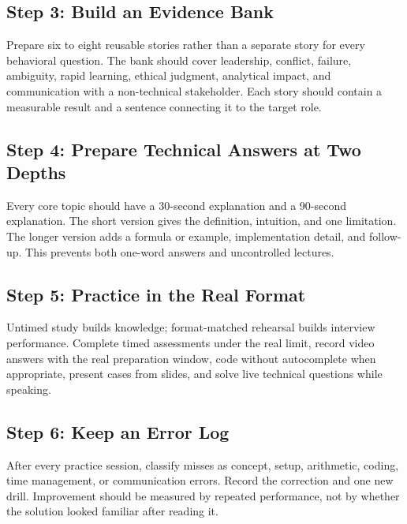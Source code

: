 \documentclass[11pt,letterpaper,openany]{book}
\begin{document}
\subsection{Step 3: Build an Evidence Bank}
Prepare six to eight reusable stories rather than a separate story for every behavioral question. The bank should cover leadership, conflict, failure, ambiguity, rapid learning, ethical judgment, analytical impact, and communication with a non-technical stakeholder. Each story should contain a measurable result and a sentence connecting it to the target role.

\subsection{Step 4: Prepare Technical Answers at Two Depths}
Every core topic should have a 30-second explanation and a 90-second explanation. The short version gives the definition, intuition, and one limitation. The longer version adds a formula or example, implementation detail, and follow-up. This prevents both one-word answers and uncontrolled lectures.

\subsection{Step 5: Practice in the Real Format}
Untimed study builds knowledge; format-matched rehearsal builds interview performance. Complete timed assessments under the real limit, record video answers with the real preparation window, code without autocomplete when appropriate, present cases from slides, and solve live technical questions while speaking.

\subsection{Step 6: Keep an Error Log}
After every practice session, classify misses as concept, setup, arithmetic, coding, time management, or communication errors. Record the correction and one new drill. Improvement should be measured by repeated performance, not by whether the solution looked familiar after reading it.
\end{document}
